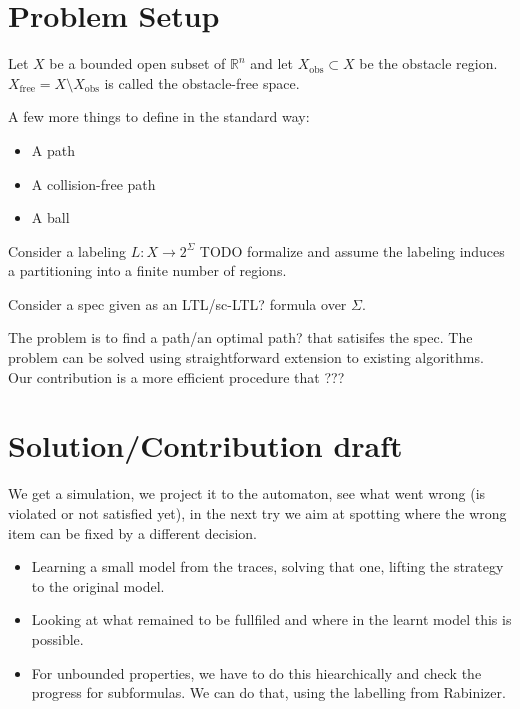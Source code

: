 \documentclass{article}
\newcommand{\jana}[1]{{\color{magenta} #1}}
\newcommand{\Real}{\mathbb{R}}
\newcommand{\obs}{\mathrm{obs}}
\newcommand{\free}{\mathrm{free}}
\newcommand{\AP}{\Sigma}
\begin{document}
\section{Problem Setup}

Let $X$ be a bounded open subset of $\Real^n$ and let $X_\obs \subset X$ be the obstacle region. $X_\free = X \setminus X_\obs$ is called the obstacle-free space. 

A few more things to define in the standard way:
\begin{itemize}
\item A path
\item A collision-free path
\item A ball
\end{itemize}

Consider a labeling $L: X \rightarrow 2^\AP$ \jana{TODO formalize and assume the labeling induces a partitioning into a finite number of regions}. 

Consider a spec given as an \jana{LTL/sc-LTL?} formula over $\AP$.

The problem is to find \jana{a path/an optimal path?} that satisifes the spec. The problem can be solved using straightforward extension to existing algorithms. \jana{Our contribution is a more efficient procedure that ???}

\section{Solution/Contribution draft}

We get a simulation, we project it to the automaton, see what went wrong (is violated or not satisfied yet), in the next try we aim at spotting where the wrong item can be fixed by a different decision.


\begin{itemize}
	\item Learning a small model from the traces, solving that one, lifting the strategy to the original model.
	\item Looking at what remained to be fullfiled and where in the learnt model this is possible.
	\item For unbounded properties, we have to do this hiearchically and check the progress for subformulas. We can do that, using the labelling from Rabinizer.
\end{itemize}
\end{document}
